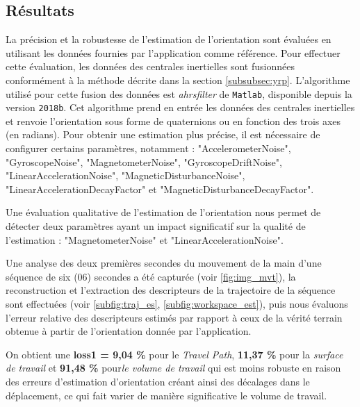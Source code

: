 \documentclass[8pt]{article}
\begin{document}
\subsection{Résultats}
La précision et la robustesse de l'estimation de l'orientation sont évaluées en utilisant les données fournies par l'application comme référence. Pour effectuer cette évaluation, les données des centrales inertielles sont fusionnées conformément à la méthode décrite dans la section \ref{subsubsec:yrp}. L'algorithme utilisé pour cette fusion des données est \textit{ahrsfilter} de \texttt{Matlab}, disponible depuis la version \texttt{2018b}. Cet algorithme prend en entrée les données des centrales inertielles et renvoie l'orientation sous forme de quaternions ou en fonction des trois axes (en radians). Pour obtenir une estimation plus précise, il est nécessaire de configurer certains paramètres, notamment : "AccelerometerNoise", "GyroscopeNoise", "MagnetometerNoise", "GyroscopeDriftNoise", "LinearAccelerationNoise", "MagneticDisturbanceNoise", "LinearAccelerationDecayFactor" et "MagneticDisturbanceDecayFactor". 

Une évaluation qualitative de l'estimation de l'orientation nous permet de détecter deux paramètres ayant un impact significatif sur la qualité de l'estimation : "MagnetometerNoise" et "LinearAccelerationNoise". 

Une analyse des deux premières secondes du mouvement de la main d'une séquence de six (06) secondes a été capturée (voir \ref{fig:img_mvt}), la reconstruction et l'extraction des descripteurs de la trajectoire de la séquence sont effectuées (voir \ref{subfig:traj_es}, \ref{subfig:workspace_est}), puis nous évaluons l'erreur relative des descripteurs estimés par rapport à ceux de la vérité terrain obtenue à partir de l'orientation donnée par l'application.

On obtient une \textbf{loss1 = 9,04 \%} pour le \textit{Travel Path}, \textbf{11,37 \%} pour la \textit{surface de travail} et \textbf{91,48 \%} pour\textit{le volume de travail} qui est moins robuste en raison des erreurs d'estimation d'orientation créant ainsi des décalages dans le déplacement, ce qui fait varier de manière significative le volume de travail.
\end{document}
